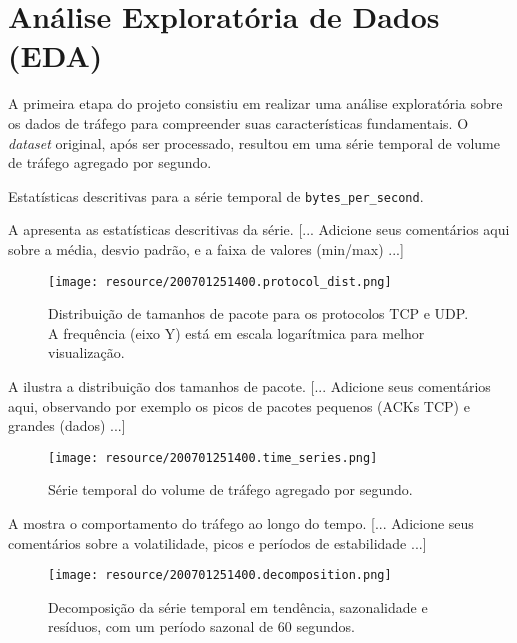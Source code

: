 \section{Análise Exploratória de Dados (EDA)}

A primeira etapa do projeto consistiu em realizar uma análise exploratória sobre os dados de tráfego para
compreender suas características fundamentais.
O \emph{dataset} original, após ser processado, resultou em uma série temporal de volume de tráfego agregado
por segundo.

\begin{table}[!htb]
    \centering
    \caption{Estatísticas descritivas para a série temporal de \texttt{bytes\_per\_second}.}
    \label{tab:eda-describe}
    
\end{table}

A  apresenta as estatísticas descritivas da série.
[... Adicione seus comentários aqui sobre a média, desvio padrão, e a faixa de valores (min/max) ...]

\begin{figure}[!htb]
    \centering
    \texttt{[image: resource/200701251400.protocol\_dist.png]}
    \caption{Distribuição de tamanhos de pacote para os protocolos TCP e UDP. A frequência (eixo Y) está em
    escala logarítmica para melhor visualização.}
    \label{fig:eda-protocol-dist}
\end{figure}

A  ilustra a distribuição dos tamanhos de pacote.
[... Adicione seus comentários aqui, observando por exemplo os picos de pacotes pequenos (ACKs TCP) e grandes
(dados) ...]

\begin{figure}[!htb]
    \centering
    \texttt{[image: resource/200701251400.time\_series.png]}
    \caption{Série temporal do volume de tráfego agregado por segundo.}
    \label{fig:eda-timeseries}
\end{figure}

A  mostra o comportamento do tráfego ao longo do tempo.
[... Adicione seus comentários sobre a volatilidade, picos e períodos de estabilidade ...]

\begin{figure}[!htb]
    \centering
    \texttt{[image: resource/200701251400.decomposition.png]}
    \caption{Decomposição da série temporal em tendência, sazonalidade e resíduos, com um período sazonal de
    60 segundos.}
    \label{fig:eda-decomposition}
\end{figure}

